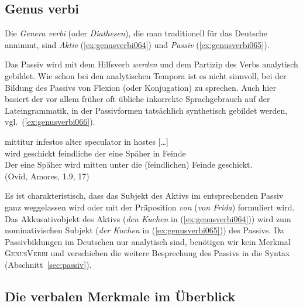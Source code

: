 \subsection{Genus verbi}
\label{sec:genusverbi}


Die \textit{Genera verbi} (oder \textit{Diathesen}), die man traditionell für das Deutsche annimmt, sind \textit{Aktiv} (\ref{ex:genusverbi064}) und \textit{Passiv} (\ref{ex:genusverbi065}).

\begin{exe}
\end{exe}

Das Passiv wird mit dem Hilfsverb \textit{werden} und dem Partizip des Verbs analytisch gebildet.
Wie schon bei den analytischen Tempora ist es nicht sinnvoll, bei der Bildung des Passivs von Flexion (oder Konjugation) zu sprechen.
Auch hier basiert der vor allem früher oft übliche inkorrekte Sprachgebrauch auf der Lateingrammatik, in der Passivformen tatsächlich synthetisch gebildet werden, vgl.\ (\ref{ex:genusverbi066}).

\begin{exe}
  \ex\label{ex:genusverbi066}\gll mittitur infestos alter speculator in hostes [\ldots]\\
  {wird geschickt} {feindliche} {der eine} Späher {in} {Feinde}\\
  \glt Der eine Späher wird mitten unter die (feindlichen) Feinde geschickt.\\
  (Ovid, Amores, 1.9, 17)
\end{exe}

Es ist charakteristisch, dass das Subjekt des Aktivs im entsprechenden Passiv ganz weggelassen wird oder mit der Präposition \textit{von} (\zB \textit{von Frida}) formuliert wird.
Das Akkusativobjekt des Aktivs (\textit{den Kuchen} in (\ref{ex:genusverbi064})) wird zum nominativischen Subjekt (\textit{der Kuchen} in (\ref{ex:genusverbi065})) des Passivs.
Da Passivbildungen im Deutschen nur analytisch sind, benötigen wir kein Merkmal \textsc{GenusVerbi} und verschieben die weitere Besprechung des Passivs in die Syntax (Abschnitt~\ref{sec:passiv}).

\subsection{Die verbalen Merkmale im Überblick}
\label{sec:dieverbalenmerkmaleimueberblick}

